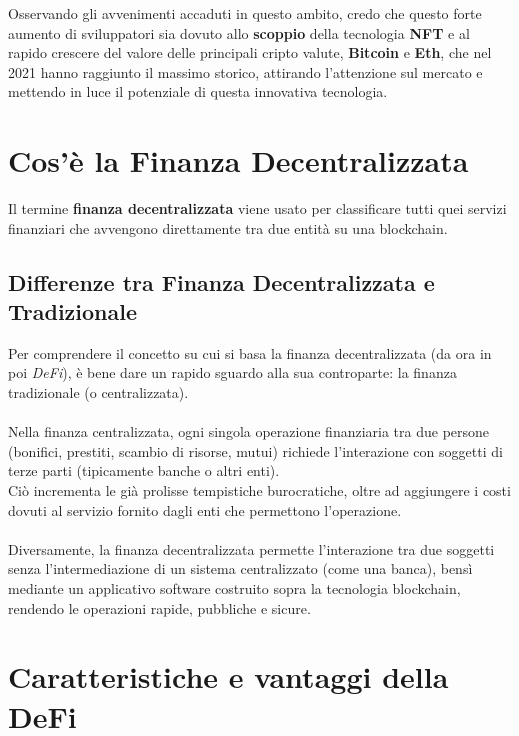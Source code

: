 \documentclass[12pt,a4paper]{report}
\begin{document}
\noindent Osservando gli avvenimenti accaduti in questo ambito, credo che questo forte aumento di sviluppatori sia dovuto allo \textbf{scoppio} della tecnologia \textbf{NFT} e al rapido crescere del valore delle principali cripto valute, \textbf{Bitcoin} e \textbf{Eth}, che nel 2021 hanno raggiunto il massimo storico, attirando l'attenzione sul mercato e mettendo in luce il potenziale di questa innovativa tecnologia.

\section{Cos'è la Finanza Decentralizzata}

Il termine \textbf{finanza decentralizzata} viene usato per classificare tutti quei servizi finanziari che avvengono direttamente tra due entità su una blockchain.

\subsection{Differenze tra Finanza Decentralizzata e Tradizionale}

Per comprendere il concetto su cui si basa la finanza decentralizzata (da ora in poi \textit{DeFi}), è bene dare un rapido sguardo alla sua controparte: la finanza tradizionale (o centralizzata).\\\\
Nella finanza centralizzata, ogni singola operazione finanziaria tra due persone (bonifici, prestiti, scambio di risorse, mutui) richiede l'interazione con soggetti di terze parti (tipicamente banche o altri enti).\\
Ciò incrementa le già prolisse tempistiche burocratiche, oltre ad aggiungere i costi dovuti al servizio fornito dagli enti che permettono l'operazione.
\\\\Diversamente, la finanza decentralizzata permette l'interazione tra due soggetti senza l'intermediazione di un sistema centralizzato (come una banca), bensì mediante un applicativo software costruito sopra la tecnologia blockchain, rendendo le operazioni rapide, pubbliche e sicure.


\section{Caratteristiche e vantaggi della DeFi}
\end{document}

